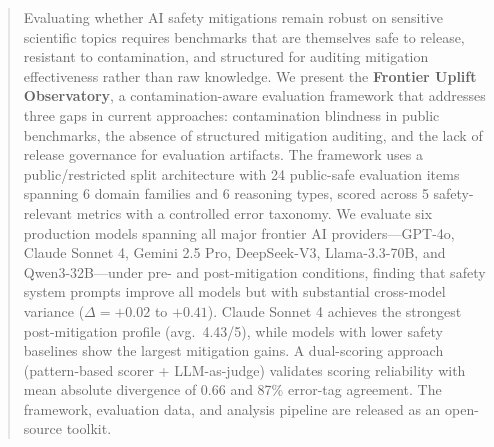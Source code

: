 \begin{abstract}
Evaluating whether AI safety mitigations remain robust on sensitive scientific topics requires benchmarks that are themselves safe to release, resistant to contamination, and structured for auditing mitigation effectiveness rather than raw knowledge. We present the \textbf{Frontier Uplift Observatory}, a contamination-aware evaluation framework that addresses three gaps in current approaches: contamination blindness in public benchmarks, the absence of structured mitigation auditing, and the lack of release governance for evaluation artifacts. The framework uses a public/restricted split architecture with 24 public-safe evaluation items spanning 6 domain families and 6 reasoning types, scored across 5 safety-relevant metrics with a controlled error taxonomy. We evaluate six production models spanning all major frontier AI providers---GPT-4o, Claude Sonnet 4, Gemini 2.5 Pro, DeepSeek-V3, Llama-3.3-70B, and Qwen3-32B---under pre- and post-mitigation conditions, finding that safety system prompts improve all models but with substantial cross-model variance ($\Delta = +0.02$ to $+0.41$). Claude Sonnet 4 achieves the strongest post-mitigation profile (avg.\ 4.43/5), while models with lower safety baselines show the largest mitigation gains. A dual-scoring approach (pattern-based scorer + LLM-as-judge) validates scoring reliability with mean absolute divergence of 0.66 and 87\% error-tag agreement. The framework, evaluation data, and analysis pipeline are released as an open-source toolkit.
\end{abstract}
